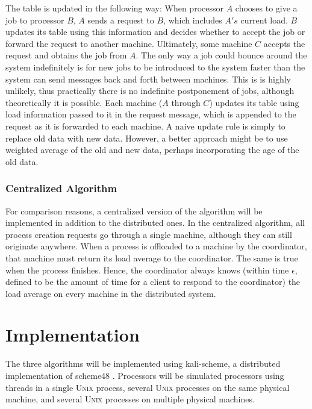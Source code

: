 \documentclass{article}
\newcommand{\UNIX}{\textsc{Unix}\xspace}
\begin{document}
The table is updated in the following way: When processor $A$ chooses to
give a job to processor $B$, $A$ sends a request to $B$, which includes
$A's$ current load.  $B$ updates its table using this information and
decides whether to accept the job or forward the request to another machine.
Ultimately, some machine $C$ accepts the request and obtains the job from
$A$.  The only way a job could bounce around the system indefinitely is for
new jobs to be introduced to the system faster than the system can send
messages back and forth between machines.  This is is highly unlikely, thus
practically there is no indefinite postponement of jobs, although
theoretically it is possible.  Each machine ($A$ through $C$) updates its
table using load information passed to it in the request message, which is
appended to the request as it is forwarded to each machine.  A naive update
rule is simply to replace old data with new data.  However, a better
approach might be to use weighted average of the old and new data, perhaps
incorporating the age of the old data.


\subsubsection{Centralized Algorithm}

For comparison reasons, a centralized version of the algorithm will be
implemented in addition to the distributed ones.  In the centralized
algorithm, all process creation requests go through a single machine,
although they can still originate anywhere.  When a process is offloaded to
a machine by the coordinator, that machine must return its load average to
the coordinator.  The same is true when the process finishes.  Hence, the
coordinator always knows (within time $\epsilon$, defined to be the amount of
time for a client to respond to the coordinator) the load average on every
machine in the distributed system.



\section{Implementation}

The three algorithms will be implemented using kali-scheme, a distributed
implementation of scheme48 \cite{kali}.  Processors will be simulated
processors using threads in a single \UNIX process, several \UNIX processes
on the same physical machine, and several \UNIX processes on multiple
physical machines.
\end{document}
